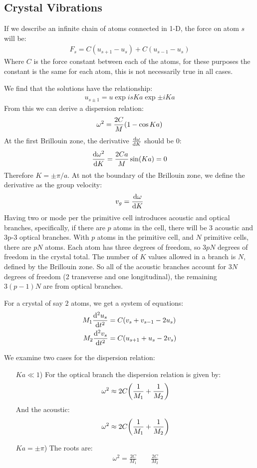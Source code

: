 \documentclass[12pt]{article}
\begin{document}
\subsection{Crystal Vibrations}
If we describe an infinite chain of atoms connected in 1-D, the force on atom $s$ will be:
\begin{align*}
  F_s=C(u_{s+1}-u_s)+C(u_{s-1}-u_s)
\end{align*}
Where $C$ is the force constant between each of the atoms, for these purposes the constant is the same for each atom, this is not necessarily true in all cases.

We find that the solutions have the relationship:
\begin{align*}
  u_{s\pm1}=u\exp{isKa}\exp{\pm iKa}
\end{align*}
From this we can derive a dispersion relation:
\begin{align*}
  \omega^2=\frac{2C}{M}\qty(1-\cos Ka)
\end{align*}
At the first Brillouin zone, the derivative $\dv{\omega}{K}$ should be $0$:
\begin{align*}
  \dv{\omega^2}{K}=\frac{2Ca}{M}\sin(Ka)=0
\end{align*}
Therefore $K=\pm\pi/a$. At not the boundary of the Brillouin zone, we define the derivative as the group velocity:
\begin{align*}
  v_g=\dv{\omega}{K}
\end{align*}
Having two or mode per the primitive cell introduces acoustic and optical branches, specifically, if there are $p$ atoms in the cell, there will be 3 acoustic and 3p-3 optical branches. With $p$ atoms in the primitive cell, and $N$ primitive cells, there are $pN$ atoms. Each atom has three degrees of freedom, so $3pN$ degrees of freedom in the crystal total. The number of $K$ values allowed in a branch is $N$, defined by the Brillouin zone. So all of the acoustic branches account for $3N$ degrees of freedom (2 transverse and one longitudinal), the remaining $3(p-1)N$ are from optical branches.

For a crystal of say $2$ atoms, we get a system of equations:
\begin{align*}
  M_1\dv[2]{u_s}{t}&=C(v_s+v_{s-1}-2u_s)\\
  M_2\dv[2]{v_s}{t}&=C(u_{s+1}+u_s-2v_s)
\end{align*}

We examine two cases for the dispersion relation:
\begin{itemize}
\item[$Ka\ll1$)]For the optical branch the dispersion relation is given by:
  \begin{align*}
    \omega^2\approx2C\qty(\frac{1}{M_1}+\frac{1}{M_2})
  \end{align*}
  And the acoustic:
  \begin{align*}
    \omega^2\approx2C\qty(\frac{1}{M_1}+\frac{1}{M_2})
  \end{align*}
\item[$Ka=\pm\pi$)] The roots are:
  \begin{align*}
    \omega^2=\frac{2C}{M_1}\qquad\frac{2C}{M_2}
  \end{align*}
\end{itemize}
\end{document}
